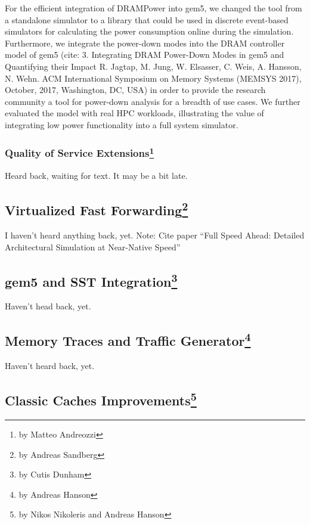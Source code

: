 For the efficient integration of DRAMPower into gem5, we changed the tool from a standalone simulator to a library that could be used in discrete event-based simulators for calculating the power consumption online during the simulation.
Furthermore, we integrate the power-down modes into the DRAM controller model of gem5 (cite: 3.	Integrating DRAM Power-Down Modes in gem5 and Quantifying their Impact R. Jagtap, M. Jung, W. Elsasser, C. Weis, A. Hansson, N. Wehn. ACM International Symposium on Memory Systems (MEMSYS 2017), October, 2017, Washington, DC, USA) in order to provide the research community a tool for power-down analysis for a breadth of use cases. We further evaluated the model with real HPC workloads, illustrating the value of integrating low power functionality into a full system simulator.

\subsubsection[Quality of Service Extensions]{Quality of Service Extensions\footnote{by Matteo Andreozzi}}

Heard back, waiting for text.
It may be a bit late.

\subsection[Virtualized Fast Forwarding]{Virtualized Fast Forwarding\footnote{by Andreas Sandberg}}

I haven't heard anything back, yet.
Note: Cite paper ``Full Speed Ahead: Detailed Architectural Simulation at Near-Native Speed''

\subsection[gem5 and SST Integration]{gem5 and SST Integration\footnote{by Cutis Dunham}}

Haven't head back, yet.

\subsection[Memory Traces and Traffic Generator]{Memory Traces and Traffic Generator\footnote{by Andreas Hanson}}

Haven't heard back, yet.

\subsection[Classic Caches Improvements]{Classic Caches Improvements\footnote{by Nikos Nikoleris and Andreas Hanson}}

